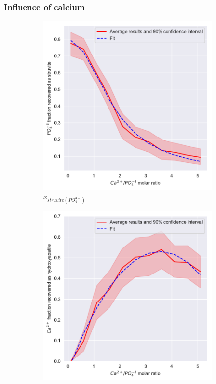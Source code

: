 \documentclass[10pt,a4paper]{article}
\begin{document}
\subsubsection{Influence of calcium}
\begin{figure}[H] 
	\centering
	\begin{subfigure}[t]{0.32\textheight}
		\includegraphics[width=\textwidth]{plotStrYield_Ca}
		\caption{$x_{struvite \left(PO_{4}^{3-}\right)}$}
		\label{fig:estimation_Ca_value}
	\end{subfigure}
	\begin{subfigure}[t]{0.32\textheight}
		\includegraphics[width=\textwidth]{x_plotHAPYield_Ca} 

\end{subfigure}
\end{figure}
\end{document}
